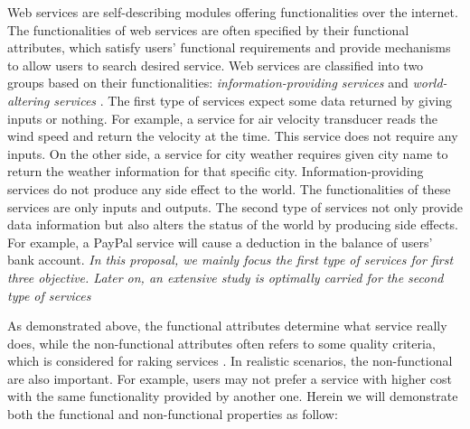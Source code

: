 Web services are self-describing modules offering functionalities over the internet. The functionalities of web services are often specified by their functional attributes, which satisfy users' functional requirements and provide mechanisms to allow users to search desired service. Web services are classified into two groups based on their functionalities:  \emph{information-providing services} and \emph{world-altering services} \cite{mcilraith2001semantic}. The first type of services expect some data returned by giving inputs or nothing. For example, a service for air velocity transducer reads the wind speed and return the velocity at the time. This service does not require any inputs. On the other side, a service for city weather requires given city name to return the weather information for that specific city. Information-providing services do not produce any side effect to the world. The functionalities of these services are only inputs and outputs. The second type of services not only provide data information but also alters the status of the world by producing side effects. For example, a PayPal service will cause a deduction in the balance of users' bank account. \emph{In this proposal, we mainly focus the first type of services for first three objective. Later on, an extensive study is optimally carried for the second type of services}

As demonstrated above, the functional attributes determine what service really does, while the non-functional attributes often refers to some quality criteria, which is considered for raking services \cite{agarwal2009making}. In realistic scenarios, the non-functional are also important. For example, users may not prefer a service with higher cost with the same functionality provided by another one. Herein we will demonstrate both the functional and non-functional properties as follow:



